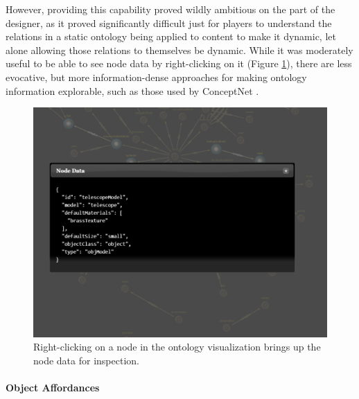 
However, providing this capability proved wildly ambitious on the part of the designer, as it proved significantly difficult just for players to understand the relations in a static ontology being applied to content to make it dynamic, let alone allowing those relations to themselves be dynamic. While it was moderately useful to be able to see node data by right-clicking on it (Figure \ref{fig:substrate-detail}), there are less evocative, but more information-dense approaches for making ontology information explorable, such as those used by ConceptNet \cite{liu2004conceptnet}.


\begin{figure}
    \centering
    \includegraphics[width=\textwidth]{figures/4-Delve/substrate-detail.png}
    \caption{Right-clicking on a node in the ontology visualization brings up the node data for inspection.}
    \label{fig:substrate-detail}
\end{figure}


\paragraph{Object Affordances}\label{par:delve-object-affordances}

